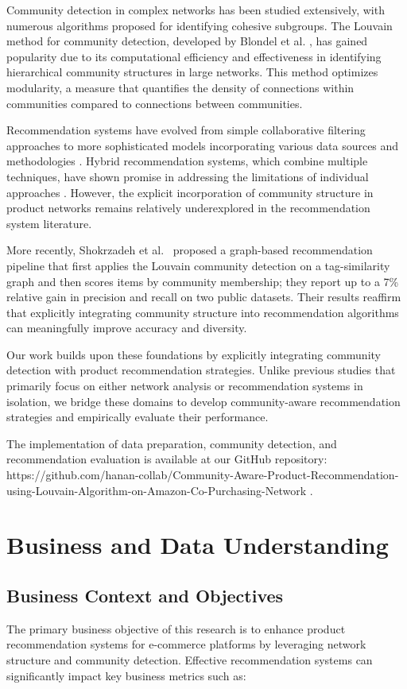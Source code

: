 \documentclass[conference]{IEEEtran}
\begin{document}
Community detection in complex networks has been studied extensively, with numerous algorithms proposed for identifying cohesive subgroups. The Louvain method for community detection, developed by Blondel et al. \cite{blondel2008fast}, has gained popularity due to its computational efficiency and effectiveness in identifying hierarchical community structures in large networks. This method optimizes modularity, a measure that quantifies the density of connections within communities compared to connections between communities.

Recommendation systems have evolved from simple collaborative filtering approaches to more sophisticated models incorporating various data sources and methodologies \cite{ricci2011introduction}. Hybrid recommendation systems, which combine multiple techniques, have shown promise in addressing the limitations of individual approaches \cite{burke2002hybrid}. However, the explicit incorporation of community structure in product networks remains relatively underexplored in the recommendation system literature.

More recently, Shokrzadeh et al.\ \cite{shokrzadeh2022graph} proposed a graph-based recommendation pipeline that first applies the Louvain community detection on a tag-similarity graph and then scores items by community membership; they report up to a 7\% relative gain in precision and recall on two public datasets. Their results reaffirm that explicitly integrating community structure into recommendation algorithms can meaningfully improve accuracy and diversity.

Our work builds upon these foundations by explicitly integrating community detection with product recommendation strategies. Unlike previous studies that primarily focus on either network analysis or recommendation systems in isolation, we bridge these domains to develop community-aware recommendation strategies and empirically evaluate their performance.

The implementation of data preparation, community detection, and recommendation evaluation is available at our GitHub repository: https://github.com/hanan-collab/Community-Aware-Product-Recommendation-using-Louvain-Algorithm-on-Amazon-Co-Purchasing-Network \cite{repo}.

\section{Business and Data Understanding}
\subsection{Business Context and Objectives}
The primary business objective of this research is to enhance product recommendation systems for e-commerce platforms by leveraging network structure and community detection. Effective recommendation systems can significantly impact key business metrics such as:
\end{document}
